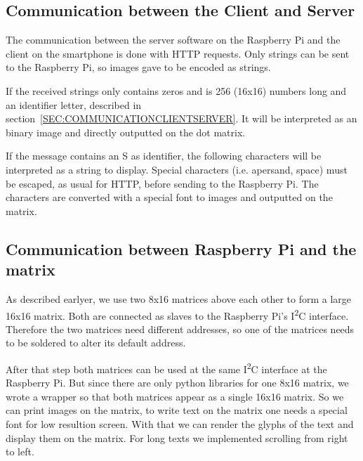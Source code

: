 \documentclass[conference]{IEEEtran}
\begin{document}
\subsection{Communication between the Client and Server}
The communication between the server software on the Raspberry Pi and the client on the smartphone is done with HTTP requests. Only strings can be sent to the Raspberry Pi, so images gave to be encoded as strings.

If the received strings only contains zeros and is 256 (16x16) numbers long and an identifier letter, described in section~\ref{SEC:COMMUNICATIONCLIENTSERVER}. It will be interpreted as an binary image and directly outputted on the dot matrix.

If the message contains an S as identifier, the following characters will be interpreted as a string to display. Special characters (i.e. apersand, space) must be escaped, as usual for HTTP, before sending to the Raspberry Pi. The characters are converted with a special font to images and outputted on the matrix.

\subsection{Communication between Raspberry Pi and the matrix}
As described earlyer, we use two 8x16 matrices above each other to form a large 16x16 matrix. Both are connected as slaves to the Raspberry Pi's I\textsuperscript{2}C interface. Therefore the two matrices need different addresses, so one of the matrices needs to be soldered to alter its default address.

After that step both matrices can be used at the same I\textsuperscript{2}C interface at the Raspberry Pi. But since there are only python libraries for one 8x16 matrix, we wrote a wrapper so that both matrices appear as a single 16x16 matrix. So we can print images on the matrix, to write text on the matrix one needs a special font for low resultion screen. With that we can render the glyphs of the text and display them on the matrix. For long texts we implemented scrolling from right to left.
\end{document}
